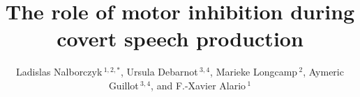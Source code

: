 \documentclass[utf8]{template/frontiersSCNS} %
\def\firstAuthorLast{Nalborczyk {et~al.}} %
\def\Authors{Ladislas Nalborczyk\,$^{1,2,*}$, Ursula Debarnot\,$^{3,4}$, Marieke Longcamp\,$^{2}$, Aymeric Guillot\,$^{3,4}$, and F.-Xavier Alario\,$^{1}$}
\begin{document}
\onecolumn
{}

\title[Motor inhibition and covert speech]{The role of motor inhibition during covert speech production}


\author[\firstAuthorLast ]{\Authors} %
\address{} %
\correspondance{} %

\extraAuth{}%

\maketitle
\end{document}
